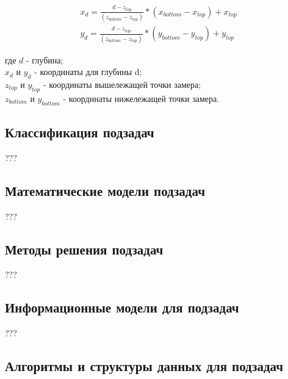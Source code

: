 \begin{equation}
  \begin{split}
    x_d = \frac{d-z_{top}}{(z_{bottom}-z_{top})}*(x_{bottom}-x_{top})+x_{top} \\
    y_d = \frac{d-z_{top}}{(z_{bottom}-z_{top})}*(y_{bottom}-y_{top})+y_{top}
  \end{split}
\end{equation}

где $ d $ - глубина;\\
$ x_d $ и $ y_d $ - координаты для глубины d; \\
$ z_{top} $ и $ y_{top} $ - координаты вышележащей точки замера;\\
$ z_{bottom} $ и $ y_{bottom} $ - координаты нижележащей точки замера.

\subsection{Классификация подзадач}
???

\subsection{Математические модели подзадач}
???

\subsection{Методы решения подзадач}
???

\subsection{Информационные модели для подзадач}
???

\subsection{Алгоритмы и структуры данных для подзадач}
